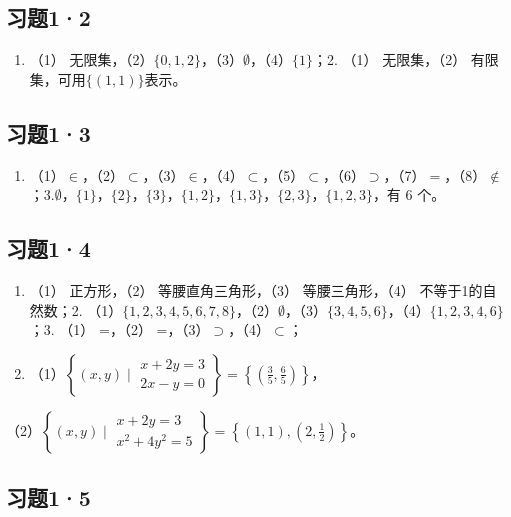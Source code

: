 \subsection{习题1·2}

\begin{enumerate}
\item
  （1）
  无限集，（2）\(\{0, 1, 2\}\)，（3）\(\emptyset\)，（4）\(\{1\}\)；2.
  （1） 无限集，（2） 有限集，可用\(\{(1,1)\}\)表示。
\end{enumerate}

\subsection{习题1·3}

\begin{enumerate}
\item
  （1）\(\in\)，（2）\(\subset\)，（3）\(\in\)，（4）\(\subset\)，（5）\(\subset\)，（6）\(\supset\)，（7）\(=\)，（8）\(\notin\)；3.\(\emptyset\)，\(\{1\}\)，\(\{2\}\)，\(\{3\}\)，\(\{1, 2\}\)，\(\{1, 3\}\)，\(\{2, 3\}\)，\(\{1, 2, 3\}\)，有
  6 个。
\end{enumerate}

\subsection{习题1·4}

\begin{enumerate}
\item
  （1） 正方形，（2） 等腰直角三角形，（3） 等腰三角形，（4）
  不等于1的自然数；2.
  （1）\(\{1, 2, 3, 4, 5, 6, 7, 8\}\)，（2）\(\emptyset\)，（3）\(\{3, 4, 5, 6\}\)，（4）\(\{1, 2, 3, 4, 6\}\)；3.
  （1） =，（2） =，（3）\(\supset\)，（4）\(\subset\)；
\item
  （1）\(\left\{(x, y) \mid \begin{array}{l} x + 2y = 3 \\ 2x - y = 0 \end{array} \right\} = \left\{\left(\frac35,\frac65\right)\right\}\)，
\end{enumerate}

（2）\(\left\{(x, y) \mid \begin{array}{l} x + 2y = 3 \\ x^2 + 4y^2 = 5 \end{array} \right\} = \left\{(1, 1), \left(2, \frac{1}{2}\right)\right\}\)。

\subsection{习题1·5}

